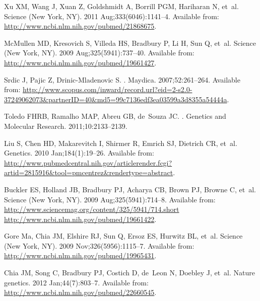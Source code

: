 \documentclass[10pt,letterpaper]{article}
\begin{document}
\begin{thebibliography}{10}
Xu XM, Wang J, Xuan Z, Goldshmidt A, Borrill PGM, Hariharan N, et~al.
\newblock Science (New York, NY). 2011 Aug;333(6046):1141--4.
\newblock Available from: \url{http://www.ncbi.nlm.nih.gov/pubmed/21868675}.

McMullen MD, Kresovich S, Villeda HS, Bradbury P, Li H, Sun Q, et~al.
\newblock Science (New York, NY). 2009 Aug;325(5941):737--40.
\newblock Available from: \url{http://www.ncbi.nlm.nih.gov/pubmed/19661427}.

Srdic J, Pajic Z, Drinic-Mladenovic S.
.
\newblock Maydica. 2007;52:261--264.
\newblock Available from:
  \url{http://www.scopus.com/inward/record.url?eid=2-s2.0-37249062073\&partnerID=40\&md5=99c7136edf3ea03599a3d8355a54444a}.

Toledo FHRB, Ramalho MAP, Abreu GB, de~Souza JC.
.
\newblock Genetics and Molecular Research. 2011;10:2133--2139.

Liu S, Chen HD, Makarevitch I, Shirmer R, Emrich SJ, Dietrich CR, et~al.
\newblock Genetics. 2010 Jan;184(1):19--26.
\newblock Available from:
  \url{http://www.pubmedcentral.nih.gov/articlerender.fcgi?artid=2815916\&tool=pmcentrez\&rendertype=abstract}.

Buckler ES, Holland JB, Bradbury PJ, Acharya CB, Brown PJ, Browne C, et~al.
\newblock Science (New York, NY). 2009 Aug;325(5941):714--8.
\newblock Available from:
  \url{http://www.sciencemag.org/content/325/5941/714.short
  http://www.ncbi.nlm.nih.gov/pubmed/19661422}.

Gore Ma, Chia JM, Elshire RJ, Sun Q, Ersoz ES, Hurwitz BL, et~al.
\newblock Science (New York, NY). 2009 Nov;326(5956):1115--7.
\newblock Available from: \url{http://www.ncbi.nlm.nih.gov/pubmed/19965431}.

Chia JM, Song C, Bradbury PJ, Costich D, de~Leon N, Doebley J, et~al.
\newblock Nature genetics. 2012 Jan;44(7):803--7.
\newblock Available from: \url{http://www.ncbi.nlm.nih.gov/pubmed/22660545}.


\end{thebibliography}
\end{document}

